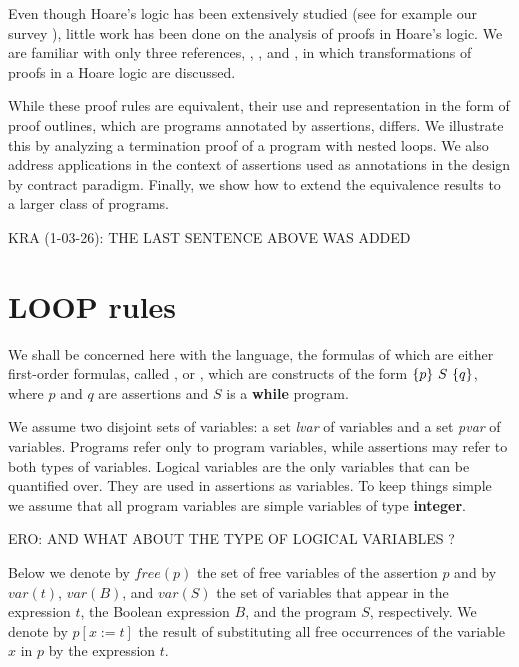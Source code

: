 \documentclass[manuscript, screen, review]{acmart}
\begin{document}
Even though Hoare's logic has been extensively studied (see for
example our survey \cite{AO19}), little work has been done on the
analysis of proofs in Hoare's logic. We are familiar with only three
references, \cite{Apt81a}, \cite{GR16}, and \cite{Tiu02}, in which
transformations of proofs in a Hoare logic are discussed.

While these proof rules are equivalent, their use and representation
in the form of proof outlines, which are programs annotated by
assertions, differs. We illustrate this by analyzing a termination
proof of a program with nested loops. We also address applications in
the context of assertions used as annotations in the design by
contract paradigm.
Finally, we show how to extend the equivalence results to a larger class of programs.

\III

\NI
KRA (1-03-26): THE LAST SENTENCE ABOVE WAS ADDED

\section{LOOP rules}

We shall be concerned here with the language, the formulas of
which are either first-order formulas, called , or
, which are constructs of the form $\mbox{$\{{p}\}\ {S}\ \{{q}\}$}$,
where $p$ and $q$ are assertions and $S$ is a \textbf{while} program.

We assume two disjoint sets of variables: a set \emph{lvar} of
 variables and a set \emph{pvar} of 
variables. Programs refer only to program variables, while assertions
may refer to both types of variables.  Logical variables are the only
variables that can be quantified over. They are used in assertions as
 variables.
To keep things simple we assume that all program variables are simple
variables of  type \textbf{integer}.

ERO: AND WHAT ABOUT THE TYPE OF LOGICAL VARIABLES ?

\III

Below we denote by $\mathit{free}(p)$
the set of free variables of the assertion $p$ and by $var(t)$, $var(B)$, and $var(S)$ 
the set of variables that appear in the
expression $t$, the Boolean expression $B$, and the program $S$, respectively.
%
% 
%
We denote by $p[x:=t]$ the result of substituting all free occurrences
of the variable $x$ in $p$ by the expression $t$. 
\end{document}
